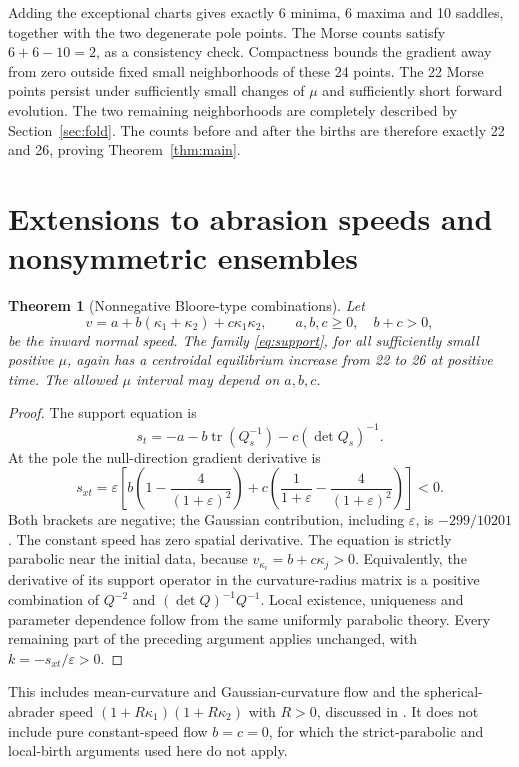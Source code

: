 \documentclass[11pt,a4paper]{article}
\newtheorem{theorem}{Theorem}[section]
\theoremstyle{remark}\newtheorem{remark}[theorem]{Remark}
\DeclareMathOperator{\tr}{tr}\DeclareMathOperator{\sgn}{sgn}\DeclareMathOperator{\Cov}{Cov}
\begin{document}
Adding the exceptional charts gives exactly 6 minima, 6 maxima and 10 saddles, together with the two degenerate pole points. The Morse counts satisfy \(6+6-10=2\), as a consistency check. Compactness bounds the gradient away from zero outside fixed small neighborhoods of these 24 points. The 22 Morse points persist under sufficiently small changes of \(\mu\) and sufficiently short forward evolution. The two remaining neighborhoods are completely described by Section~\ref{sec:fold}. The counts before and after the births are therefore exactly 22 and 26, proving Theorem~\ref{thm:main}.

\section{Extensions to abrasion speeds and nonsymmetric ensembles}
\begin{theorem}[Nonnegative Bloore-type combinations]\label{thm:bloore}
Let
\[
 v=a+b(\kappa_1+\kappa_2)+c\kappa_1\kappa_2,
 \qquad a,b,c\ge0,\quad b+c>0,
\]
be the inward normal speed. The family \eqref{eq:support}, for all sufficiently small positive \(\mu\), again has a centroidal equilibrium increase from 22 to 26 at positive time. The allowed \(\mu\) interval may depend on \(a,b,c\).
\end{theorem}
\begin{proof}
The support equation is
\[
 s_t=-a-b\tr(Q_s^{-1})-c(\det Q_s)^{-1}.
\]
At the pole the null-direction gradient derivative is
\begin{equation}\label{eq:bloorejet}
 s_{xt}=\varepsilon\left[
 b\left(1-\frac4{(1+\varepsilon)^2}\right)
 +c\left(\frac1{1+\varepsilon}-\frac4{(1+\varepsilon)^2}\right)
 \right]<0.
\end{equation}
Both brackets are negative; the Gaussian contribution, including \(\varepsilon\), is \(-299/10201\). The constant speed has zero spatial derivative. The equation is strictly parabolic near the initial data, because \(v_{\kappa_i}=b+c\kappa_j>0\). Equivalently, the derivative of its support operator in the curvature-radius matrix is a positive combination of \(Q^{-2}\) and \((\det Q)^{-1}Q^{-1}\). Local existence, uniqueness and parameter dependence follow from the same uniformly parabolic theory. Every remaining part of the preceding argument applies unchanged, with \(k=-s_{xt}/\varepsilon>0\).
\end{proof}

This includes mean-curvature and Gaussian-curvature flow and the spherical-abrader speed \((1+R\kappa_1)(1+R\kappa_2)\) with \(R>0\), discussed in \citet{D15}. It does not include pure constant-speed flow \(b=c=0\), for which the strict-parabolic and local-birth arguments used here do not apply.
\end{document}
